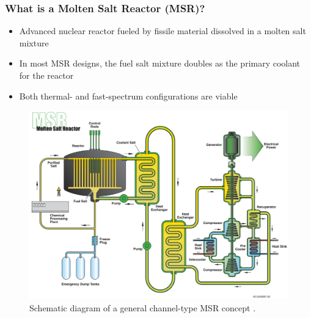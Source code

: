 \begin{frame}
  \frametitle{What is a Molten Salt Reactor (MSR)?}
	\begin{itemize}
	  \item Advanced nuclear reactor fueled by fissile
		material dissolved in a molten salt mixture
	  \item In most MSR designs, the fuel salt mixture doubles as the primary coolant for the
        reactor
	  \item Both thermal- and fast-spectrum configurations are viable
	\end{itemize}
	\begin{figure}
	  \centering
	  \includegraphics[width=.5\textwidth]{./images/msr}
      \caption{Schematic diagram of a general channel-type MSR concept
      \cite{u.s._doe_nuclear_energy_research_advisory_committee_technology_2002}.}
	  \label{fig:msr}
	\end{figure}
\end{frame}


